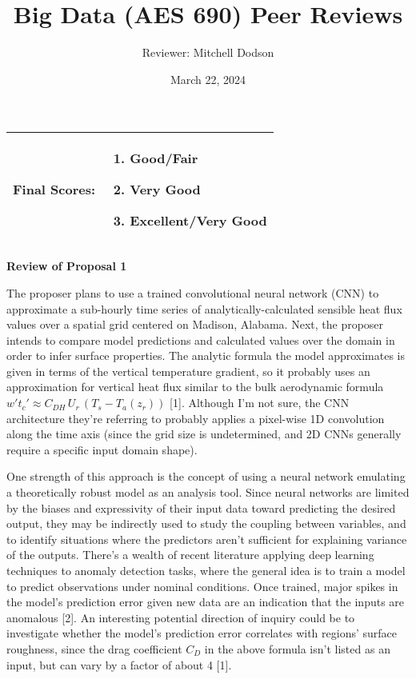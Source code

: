 \documentclass[12pt]{article}
\title{Big Data (AES 690) Peer Reviews}
\author{Reviewer: Mitchell Dodson}
\date{March 22, 2024}
\newcommand*{\problem}[2]{
    \begin{table}[ht]
    \centering
        \begin{tabular}{ | p{.1\linewidth} p{.9\linewidth} | }
            \hline
            \vspace{.3em}\textbf{\large#1:} & \vspace{.3em}\small{#2}\hspace{.2em}\vspace{.5em} \\ \hline
        \end{tabular}
    \end{table}
}
\begin{document}
\maketitle

\vspace{32em}

\problem{Final Scores}{
    \begin{enumerate}
        \item Good/Fair
        \item Very Good
        \item Excellent/Very Good
    \end{enumerate}
    }

\newpage

\noindent
{\large\textbf{Review of Proposal 1}}

The proposer plans to use a trained convolutional neural network (CNN) to approximate a sub-hourly time series of analytically-calculated sensible heat flux values over a spatial grid centered on Madison, Alabama. Next, the proposer intends to compare model predictions and calculated values over the domain in order to infer surface properties. The analytic formula the model approximates is given in terms of the vertical temperature gradient, so it probably uses an approximation for vertical heat flux similar to the bulk aerodynamic formula $w't_c' \approx C_{DH} \, U_r \, (T_s - T_a(z_r))$ [1]. Although I'm not sure, the CNN architecture they're referring to probably applies a pixel-wise 1D convolution along the time axis (since the grid size is undetermined, and 2D CNNs generally require a specific input domain shape).

One strength of this approach is the concept of using a neural network emulating a theoretically robust model as an analysis tool. Since neural networks are limited by the biases and expressivity of their input data toward predicting the desired output, they may be indirectly used to study the coupling between variables, and to identify situations where the predictors aren't sufficient for explaining variance of the outputs. There's a wealth of recent literature applying deep learning techniques to anomaly detection tasks, where the general idea is to train a model to predict observations under nominal conditions. Once trained, major spikes in the model's prediction error given new data are an indication that the inputs are anomalous [2]. An interesting potential direction of inquiry could be to investigate whether the model's prediction error correlates with regions' surface roughness, since the drag coefficient $C_D$ in the above formula isn't listed as an input, but can vary by a factor of about 4 [1].
\end{document}
